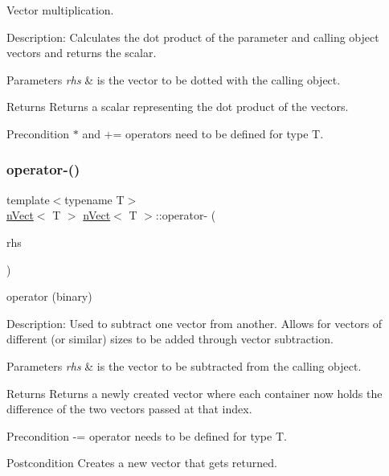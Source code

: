 Vector multiplication. 

Description\+: Calculates the dot product of the parameter and calling object vectors and returns the scalar. 
\begin{DoxyParams}{Parameters}
{\em rhs} & is the vector to be dotted with the calling object. \\
\hline
\end{DoxyParams}
\begin{DoxyReturn}{Returns}
Returns a scalar representing the dot product of the vectors. 
\end{DoxyReturn}
\begin{DoxyPrecond}{Precondition}
$\ast$ and += operators need to be defined for type T. 
\end{DoxyPrecond}
\mbox{\label{classnVect_a2941f0e337b1c7348e8b479539ea715c}} 
\subsubsection{\texorpdfstring{operator-\/()}{operator-()}\hspace{0.1cm}{\footnotesize\ttfamily [1/2]}}
{\footnotesize\ttfamily template$<$typename T$>$ \\
\hyperlink{classnVect}{n\+Vect}$<$ T $>$ \hyperlink{classnVect}{n\+Vect}$<$ T $>$\+::operator-\/ (\begin{DoxyParamCaption}\item[{const \hyperlink{classnVect}{n\+Vect}$<$ T $>$ \&}]{rhs }\end{DoxyParamCaption})}




\begin{DoxyItemize}
\item operator (binary) 
\end{DoxyItemize}

Description\+: Used to subtract one vector from another. Allows for vectors of different (or similar) sizes to be added through vector subtraction. 
\begin{DoxyParams}{Parameters}
{\em rhs} & is the vector to be subtracted from the calling object. \\
\hline
\end{DoxyParams}
\begin{DoxyReturn}{Returns}
Returns a newly created vector where each container now holds the difference of the two vectors passed at that index. 
\end{DoxyReturn}
\begin{DoxyPrecond}{Precondition}
-\/= operator needs to be defined for type T. 
\end{DoxyPrecond}
\begin{DoxyPostcond}{Postcondition}
Creates a new vector that gets returned. 
\end{DoxyPostcond}
\mbox{\label{classnVect_a24677bbe43b1a1f5d77b36e7b96bcb98}} 
